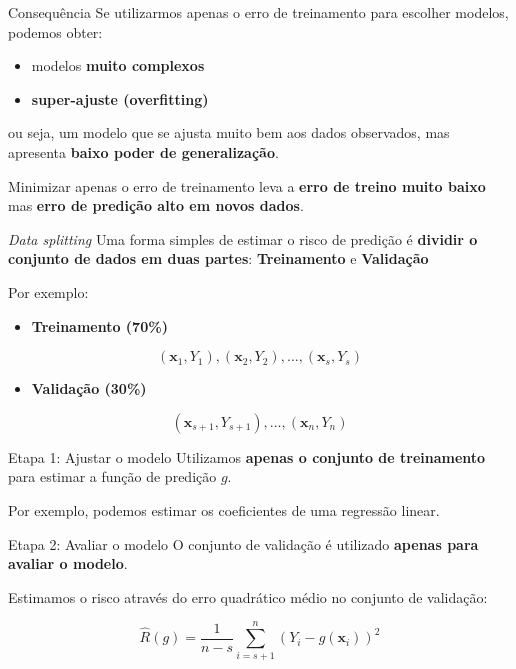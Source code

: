 \documentclass[
  ignorenonframetext,
  aspectratio=169,
]{beamer}
\providecommand{\tightlist}{%
  \setlength{\itemsep}{0pt}\setlength{\parskip}{0pt}}
\begin{document}
\begin{frame}
\begin{block}{Consequência}
\label{consequuxeancia}
Se utilizarmos apenas o erro de treinamento para escolher modelos,
podemos obter:

\begin{itemize}
\tightlist
\item
  modelos \textbf{muito complexos}
\item
  \textbf{super-ajuste (overfitting)}
\end{itemize}

ou seja, um modelo que se ajusta muito bem aos dados observados, mas
apresenta \textbf{baixo poder de generalização}.

Minimizar apenas o erro de treinamento leva a \textbf{erro de treino
muito baixo} mas \textbf{erro de predição alto em novos dados}.
\end{block}
\end{frame}

\begin{frame}{\emph{Data splitting}}
\label{data-splitting}
Uma forma simples de estimar o risco de predição é \textbf{dividir o
conjunto de dados em duas partes}: \textbf{Treinamento} e
\textbf{Validação}

Por exemplo:

\begin{itemize}
\tightlist
\item
  \textbf{Treinamento (70\%)}
\end{itemize}

\[
(\mathbf{x}_1,Y_1),(\mathbf{x}_2,Y_2),\ldots,(\mathbf{x}_s,Y_s)
\]

\begin{itemize}
\tightlist
\item
  \textbf{Validação (30\%)}
\end{itemize}

\[
(\mathbf{x}_{s+1},Y_{s+1}),\ldots,(\mathbf{x}_n,Y_n)
\]
\end{frame}

\begin{frame}
\begin{block}{Etapa 1: Ajustar o modelo}
\label{etapa-1-ajustar-o-modelo}
Utilizamos \textbf{apenas o conjunto de treinamento} para estimar a
função de predição \(g.\)

Por exemplo, podemos estimar os coeficientes de uma regressão linear.
\end{block}

\begin{block}{Etapa 2: Avaliar o modelo}
\label{etapa-2-avaliar-o-modelo}
O conjunto de validação é utilizado \textbf{apenas para avaliar o
modelo}.

Estimamos o risco através do erro quadrático médio no conjunto de
validação:

\[
\hat{R}(g) =
\frac{1}{n-s}
\sum_{i=s+1}^{n}
(Y_i - g(\mathbf{x}_i))^2
\]
\end{block}
\end{frame}
\end{document}
